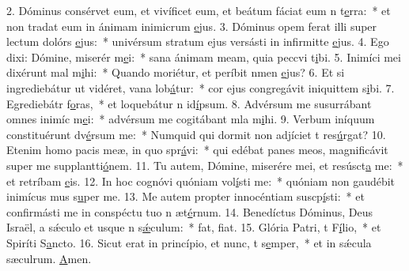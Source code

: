 2. Dóminus consérvet eum, et vivíficet eum, et beátum fáciat eum n t\uline{e}rra:~* et non tradat eum in ánimam inimicrum \uline{e}jus.
3. Dóminus opem ferat illi super lectum dolórs \uline{e}jus:~* univérsum stratum ejus versásti in infirmitte \uline{e}jus.
4. Ego dixi: Dómine, miserér m\uline{e}i:~* sana ánimam meam, quia peccvi t\uline{i}bi.
5. Inimíci mei dixérunt mal m\uline{i}hi:~* Quando moriétur, et períbit nmen \uline{e}jus?
6. Et si ingrediebátur ut vidéret, vana lob\uline{á}tur:~* cor ejus congregávit iniquittem s\uline{i}bi.
7. Egrediebátr f\uline{o}ras,~* et loquebátur n id\uline{í}psum.
8. Advérsum me susurrábant omnes inimíc m\uline{e}i:~* advérsum me cogitábant mla m\uline{i}hi.
9. Verbum iníquum constituérunt dv\uline{é}rsum me:~* Numquid qui dormit non adjíciet t res\uline{ú}rgat?
10. Etenim homo pacis meæ, in quo spr\uline{á}vi:~* qui edébat panes meos, magnificávit super me supplantti\uline{ó}nem.
11. Tu autem, Dómine, miserére mei, et resúsct\uline{a} me:~* et retríbam \uline{e}is.
12. In hoc cognóvi quóniam vol\uline{í}sti me:~* quóniam non gaudébit inimícus mus s\uline{u}per me.
13. Me autem propter innocéntiam suscp\uline{í}sti:~* et confirmásti me in conspéctu tuo n æt\uline{é}rnum.
14. Benedíctus Dóminus, Deus Israël, a sǽculo et usque n s\uline{ǽ}culum:~* fat, f\uline{i}at.
15. Glória Patri, t F\uline{í}lio,~* et Spiríti S\uline{a}ncto.
16. Sicut erat in princípio, et nunc, t s\uline{e}mper,~* et in sǽcula sæculrum. \uline{A}men.
